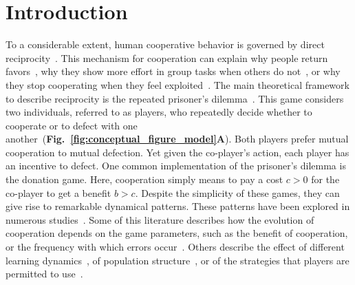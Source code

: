 \documentclass[11pt]{article}
\newcommand{\figref}[1]{{\textbf{Fig.~\ref{#1}}}}
\begin{document}

\section*{Introduction}

To a considerable extent, human cooperative behavior is governed by direct reciprocity~\cite{melis:ptrs:2010,rand:TCS:2013}. 
This mechanism for cooperation can explain why people return favors~\citep{neilson:JEBO:1999}, why they show more effort in group tasks when others do not~\citep{fischbacher:AER:2010}, or why they stop cooperating when they feel exploited~\citep{hilbe:ncomms:2014,Xu:NComms:2016}. 
The main theoretical framework to describe reciprocity is the repeated prisoner's dilemma~\cite{axelrod:AAAS:1981, nowak:Science:2006, sigmund2010,Garcia:FRAI:2018,hilbe:Nature:2018,Rossetti:ETH:2023}. 
This game considers two individuals, referred to as players, who repeatedly decide whether to cooperate or to defect with one another~(\figref{fig:conceptual_figure_model}\textbf{A}). 
Both players prefer mutual cooperation to mutual defection. 
Yet given the co-player's action, each player has an incentive to defect. 
One common implementation of the prisoner's dilemma is the donation game. 
Here, cooperation simply means to pay a cost $c\!>\!0$ for the co-player to get a benefit $b\!>\!c$. 
Despite the simplicity of these games, they can give rise to remarkable dynamical patterns. 
These patterns have been explored in numerous studies~\citep{frean:PRSB:1994,killingback:PRSB:1999,hauert:JTB:2002b,kurokawa:PRSB:2009,pinheiro:PLoSCB:2014,garcia:jet:2016,mcavoy:PRSA:2019,Kraines:TaD:1989,nowak:Nature:1993,imhof:PNAS:2005,grujic:jtb:2012,van-segbroeck:prl:2012,press:PNAS:2012,stewart:pnas:2013,Toupo:IJBC:2014,stewart:pnas:2014, akin:EGADS:2016,glynatsi:scientific:2020,chen:PNASnexus:2023}.
Some of this literature describes how the evolution of cooperation depends on the game parameters, such as the benefit of cooperation, or the frequency with which errors occur~\citep{boyd:JTB:1989,Hao:PRE:2015,Zhang:GEB:2018,Mamiya:PRE:2020}. 
Others describe the effect of different learning dynamics~\citep{stewart:games:2015,Mcavoy:PNAS:2022}, of population structure~\citep{brauchli:JTB:1999,szabo:PRE:2000b,allen:AmNat:2013,szolnoki:scirep:2014}, or of the strategies that players are permitted to use~\citep{baek:scientific:2016}.  
\end{document}
